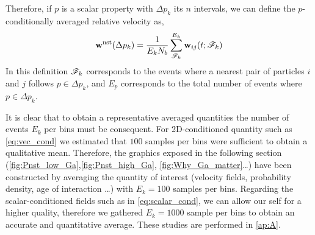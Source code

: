 Therefore, if $p$ is a scalar property with $\Delta p_k$ its $n$ intervals, we can define the $p$-conditionally averaged relative velocity as, 
\begin{equation}
    \textbf{w}^\text{nst}(\Delta p_k)
    = \frac{1}{E_{k}N_b} 
    \sum^{E_{k}}_{\mathscr{F}_{k}}  
    \textbf{w}_{ij}(t;\mathscr{F}_k)
    \label{eq:scalar_cond}
\end{equation}
In this definition $\mathscr{F}_{k}$ corresponds to the events where a nearest pair of particles $i$ and $j$ follows $p \in \Delta p_k$, and $E_{p}$ corresponds to the total number of events where $p\in\Delta p_k$. 

It is clear that to obtain a representative averaged quantities the number of events $E_k$ per bins must be consequent. 
For 2D-conditioned quantity such as \ref{eq:vec_cond} we estimated that $100$ samples per bins were sufficient to obtain a qualitative mean. 
Therefore, the graphics exposed in the following section (\ref{fig:Pnst_low_Ga},\ref{fig:Pnst_high_Ga}, \ref{fig:Why_Ga_matter}\ldots) have been constructed by averaging the quantity of interest (velocity fields, probability density, age of interaction \ldots) with $E_k = 100$ samples per bins. 
Regarding the scalar-conditioned fields  such as in \ref{eq:scalar_cond}, we can allow our self for a higher quality, therefore we gathered $E_k = 1000$ sample per bins to obtain an accurate and quantitative average. 
These studies are performed in \ref{ap:A}.




